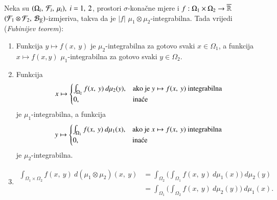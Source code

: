 \begin{zad} \label{zad:4.16}
    Neka su $(\Omega_i, \: \mathcal{F}_i, \: \mu_i), \; i = 1, \: 2$, prostori $\sigma$-kona\v cne mjere i $f : \Omega_1 \times \Omega_2 \to \overline{\mathbb{R}}$ $({\mathcal{F}_1 \otimes \mathcal{F}_2}, \: {\mathcal{B}_{\overline{\mathbb{R}}}})$-izmjeriva, takva da je $|f|$ $\mu_1 \otimes \mu_2$-integrabilna.
    Tada vrijedi (\emph{Fubinijev teorem}):
    \begin{enumerate}[label=(\roman*)]
        \item Funkcija $y \mapsto f(x, \: y)$ je $\mu_2$-integrabilna za gotovo svaki $x \in \Omega_1$, a funkcija $x \mapsto f(x, y)$ $\mu_1$-integrabilna za gotovo svaki $y \in \Omega_2$.
        \item Funkcija
        \begin{equation*}
            x \mapsto
            \begin{cases}
                \int_{\Omega_2} f(x, \: y) \: d \mu_2 (y), &\textnormal{ako je } y \mapsto f(x, \: y) \textnormal{ integrabilna}\\
                0, &\textnormal{ina\' ce} 
            \end{cases}
        \end{equation*}
        je $\mu_1$-integrabilna, a funkcija
        \begin{equation*}
            y \mapsto
            \begin{cases}
                \int_{\Omega_1} f(x, \: y) \: d \mu_1 (x), &\textnormal{ako je } x \mapsto f(x, \: y) \textnormal{ integrabilna}\\
                0, &\textnormal{ina\' ce}
            \end{cases}
        \end{equation*}
        je $\mu_2$-integrabilna.
        \item
        \begin{align*}
            \int_{\Omega_1 \times \Omega_2}  f(x, \: y) \: d (\mu_1 \otimes \mu_2)(x, \: y)  &= \int_{\Omega_2} \Big( \int_{\Omega_1} f(x, \: y) \: d \mu_1 (x) \Big) \: d \mu_2(y)\\
            &= \int_{\Omega_1} \Big( \int_{\Omega_2} f(x, \: y) \: d \mu_2 (y) \Big) \: d \mu_1(x).
        \end{align*}
    \end{enumerate}
\end{zad}

